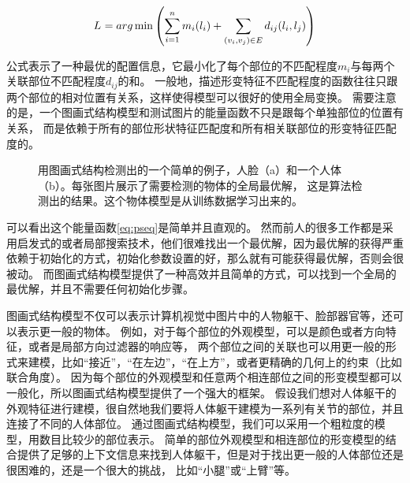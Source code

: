 \begin{equation}
    \label{eq:pseq}
    L^{\*} = arg \min {\left( \sum_{i=1}^{n} m_i(l_i) + \sum_{ (v_i, v_j) \in E } d_{ij}(l_i, l_j) \right)}
\end{equation}

公式表示了一种最优的配置信息，它最小化了每个部位的不匹配程度$m_i$与每两个关联部位不匹配程度$d_{ij}$的和。
一般地，描述形变特征不匹配程度的函数往往只跟两个部位的相对位置有关系，这样使得模型可以很好的使用全局变换。
需要注意的是，一个图画式结构模型和测试图片的能量函数不只是跟每个单独部位的位置有关系，
而是依赖于所有的部位形状特征匹配度和所有相关联部位的形变特征匹配度的。

\begin{figure}[tbp]
    \centering
    \caption{
        用图画式结构检测出的一个简单的例子，人脸（a）和一个人体（b）。每张图片展示了需要检测的物体的全局最优解，
        这是算法检测出的结果。这个物体模型是从训练数据学习出来的。
    }
    \label{fig:ps2}
\end{figure}


可以看出这个能量函数\ref{eq:pseq}是简单并且直观的。
然而前人的很多工作都是采用启发式的或者局部搜索技术，他们很难找出一个最优解，因为最优解的获得严重依赖于初始化的方式，初始化参数设置的好，那么就有可能获得最优解，否则会很被动。
而图画式结构模型提供了一种高效并且简单的方式，可以找到一个全局的最优解，并且不需要任何初始化步骤。

图画式结构模型不仅可以表示计算机视觉中图片中的人物躯干、脸部器官等，还可以表示更一般的物体。
例如，对于每个部位的外观模型，可以是颜色或者方向特征，或者是局部方向过滤器的响应等，
两个部位之间的关联也可以用更一般的形式来建模，比如“接近”，“在左边”，“在上方”，或者更精确的几何上的约束（比如联合角度）。
因为每个部位的外观模型和任意两个相连部位之间的形变模型都可以一般化，所以图画式结构模型提供了一个强大的框架。
假设我们想对人体躯干的外观特征进行建模，很自然地我们要将人体躯干建模为一系列有关节的部位，并且连接了不同的人体部位。
通过图画式结构模型，我们可以采用一个粗粒度的模型，用数目比较少的部位表示。
简单的部位外观模型和相连部位的形变模型的结合提供了足够的上下文信息来找到人体躯干，但是对于找出更一般的人体部位还是很困难的，还是一个很大的挑战，
比如“小腿”或“上臂”等。

